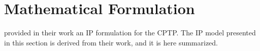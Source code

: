\begin{comment}
types of combinatorial algorithms than branch-and-cut algorithms.
Laporte and Martello [21] showed that the OP is NP-hard by reduc-
tion from the Hamilton circuit problem. Using a similar reduction it can
be shown that the CPTP also belongs to the class of NP-hard problems.
If there are no cycles with negative cost in the graph G, then the CPTP
is solvable in pseudo-polynomial time using a dynamic programming algo-
rithm. In this particular case the CPTP relates to the constrained shortest
path problem (again by transformation to a path problem). Several al-
gorithms based on dynamic programming exist for this problem, see e.g.,
Beasley and Christofides [6],Carlyle et al. [9], Dumitrescu and Boland [13],
and Muhandiramge and Boland [25].
Bixby [Polyhedral analysis and effective algorithms for the capacitated vehicle routing problem, 1999]
considers the CPTP in her PhD thesis on the CVRP and present a mathematical model
and a branch-and-cut (BAC) algorithm.  Letch-
ford and Salazar-Gonzalez [24] discuss projection results for the CVRP and
present two families of multistar inequalities that are valid for the CPTP.
Other work on the CPTP in a CVRP context is mainly concerned with
dynamic programming algorithms.
The contribution of this paper is the introduction of an IP model for the
CPTP and a BAC algorithm for solving it. This includes the adaption of
several valid inequalities from e.g. the OP and the CCCP, the introduction
of the rounded multistar inequalities, and a proof of validity for all inequal-
ities with regard to the CPTP. Also, we have successfully implemented a
separation heuristic for finding knapsack large multistar inequalities that
prove their usefulness for the CPTP. The computational experiments show
that the BAC algorithm is competitive with the state-of-the-art dynamic
programming algorithms. In particular, the BAC algorithm is able to solve
instances with 800 nodes to optimality where the dynamic programming
algorithms cannot solve instances with more than 200 nodes. In general
the two algorithms appear to complement each other well. The
\end{comment}


\section{Mathematical Formulation}
\label{sec:cptp-mathematical-formulation}

\cite{jepsen2014} provided in their work an IP formulation for the CPTP.
The IP model presented in this section is derived from their work, and it is here summarized.

